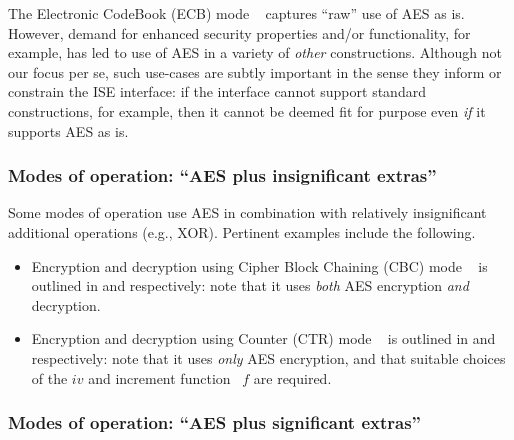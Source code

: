 
The
Electronic CodeBook (ECB) mode
~\cite[Section 6.1]{NIST:sp.800.38a} 
captures ``raw'' use of AES as is.  However, demand for enhanced security
properties and/or functionality, for example, has led to use of AES in a
variety of {\em other} constructions.
Although not our focus per se, such use-cases are subtly important in the 
sense they inform or constrain the ISE interface: if the interface cannot 
support standard constructions, for example, then it cannot be deemed fit 
for purpose even {\em if} it supports AES as is.


\subsubsection{Modes of operation: ``AES plus insignificant extras''}

Some modes of operation use AES in combination with relatively
insignificant 
additional operations
(e.g., XOR).
Pertinent examples include the following.

\begin{itemize}
\item Encryption
      and 
      decryption
      using
      Cipher Block Chaining (CBC) mode
      ~\cite[Section 6.2]{NIST:sp.800.38a}
      is outlined in
      and
      respectively:
      note that it uses {\em both} AES encryption {\em and} decryption.
\item Encryption
      and 
      decryption
      using
      Counter               (CTR) mode
      ~\cite[Section 6.5]{NIST:sp.800.38a}
      is outlined in
      and
      respectively:
      note that it uses {\em only} AES encryption, and that suitable choices of 
      the $iv$ and increment function~\cite[Appendix B]{NIST:sp.800.38a} $f$ are
      required.
\end{itemize}


\subsubsection{Modes of operation: ``AES plus   significant extras''}

